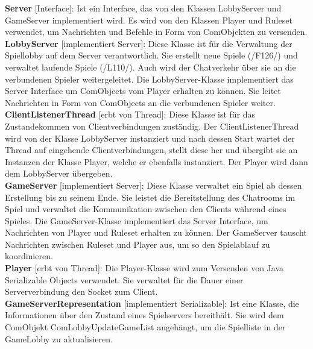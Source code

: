 \documentclass{article}
\begin{document}
\textbf{Server} [Interface]: Ist ein Interface, das von den Klassen LobbyServer und GameServer implementiert wird. Es wird von den Klassen Player und Ruleset verwendet, um Nachrichten und Befehle in Form von ComObjekten zu versenden. \\
		
\textbf{LobbyServer} [implementiert Server]: Diese Klasse ist für die Verwaltung der Spiellobby auf dem Server verantwortlich. Sie erstellt neue Spiele (/F126/) und verwaltet laufende Spiele (/L110/). Auch wird der Chatverkehr über sie an die verbundenen Spieler weitergeleitet. Die LobbyServer-Klasse implementiert das Server Interface um ComObjects vom Player erhalten zu können. Sie leitet Nachrichten in Form von ComObjects an die verbundenen Spieler weiter. \\

\textbf{ClientListenerThread} [erbt von Thread]: Diese Klasse ist für das Zustandekommen von Clientverbindungen zuständig. Der ClientListenerThread wird von der Klasse LobbyServer instanziert und nach dessen Start wartet der Thread auf eingehende Clientverbindungen, stellt diese her und übergibt sie an Instanzen der Klasse Player, welche er ebenfalls instanziert. Der Player wird dann dem LobbyServer übergeben. \\

\textbf{GameServer} [implementiert Server]: Diese Klasse verwaltet ein Spiel ab dessen Erstellung bis zu seinem Ende. Sie leistet die Bereitstellung des Chatrooms im Spiel und verwaltet die Kommunikation zwischen den Clients während eines Spieles. Die GameServer-Klasse implementiert das Server Interface, um Nachrichten von Player und Ruleset erhalten zu können. Der GameServer tauscht Nachrichten zwischen Ruleset und Player aus, um so den Spielablauf zu koordinieren.\\

\textbf{Player} [erbt von Thread]: Die Player-Klasse wird zum Versenden von Java Serializable Objects verwendet. Sie verwaltet für die Dauer einer Serververbindung den Socket zum Client. \\

\textbf{GameServerRepresentation} [implementiert Serializable]: Ist eine Klasse, die Informationen über den Zustand eines Spielservers bereithält. Sie wird dem ComObjekt ComLobbyUpdateGameList angehängt, um die Spielliste in der GameLobby zu aktualisieren.
\end{document}
